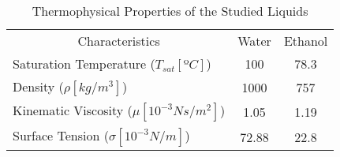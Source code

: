 \begin{table}[h]
\centering
\caption{Thermophysical Properties of the Studied Liquids}
\label{tab:props}
\begin{tabular}{lcc}
\toprule
\multicolumn{1}{c}{Characteristics} & \multicolumn{1}{c}{Water} & \multicolumn{1}{c}{Ethanol} \\
\cmidrule[0.4pt](r{0.125em}){1-3}%
Saturation Temperature ($T_{sat}[ºC]$)       & 100                 & 78.3         \\
Density ($\rho[kg/m^3]$)                   & 1000                & 757          \\
Kinematic Viscosity ($\mu[10^{-3}Ns/m^2]$) & 1.05                & 1.19         \\
Surface Tension ($\sigma[10^{-3}N/m]$)     & 72.88               & 22.8         \\ \bottomrule
\end{tabular}
\end{table}